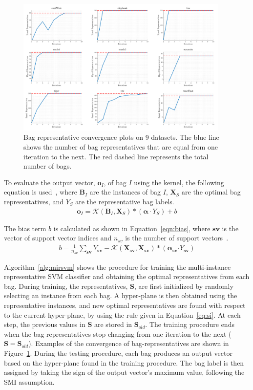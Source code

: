 \documentclass[preprint,12pt]{elsarticle}
\newcommand{\spa}[1]{\mathcal{#1}}
\begin{document}
\newpage
\begin{figure}
\centering
\label{fig:convegence}
\includegraphics[width=0.94\textwidth]{convergence.png} 
\caption{Bag representative convergence plots on 9 datasets. The blue line shows the number of bag representatives that are equal from one iteration to the next. The red dashed line represents the total number of bags.}
\end{figure}
To evaluate the output vector, $\bm o_I$, of bag $I$ using the kernel, the following equation is used~\citep{Huang2006}, where $\bm B_I$ are the instances of bag $I$, $\bm X_S$ are the optimal bag representatives, and $Y_S$ are the representative bag labels.
\begin{align}
\bm o_I = \spa{K}(\bm B_I,\bm X_S)*(\bm\alpha \cdot Y_S) + b
\end{align}

The bias term $b$ is calculated as shown in Equation~\eqref{eqn:bias}, where $\bm{sv}$ is the vector of support vector indices and $n_{sv}$ is the number of support vectors~\citep{Huang2006}.
\begin{align}
\label{eqn:bias}
b = \frac{1}{n_{sv}}\sum_{\bm{sv}} Y_{\bm{sv}} - \spa{K}(\bm X_{\bm{sv}},\bm X_{\bm{sv}})*(\bm \alpha_{\bm{sv}}\bm\cdot Y_{\bm{sv}})
\end{align}

Algorithm~\ref{alg:mirsvm} shows the procedure for training the multi-instance representative SVM classifier and obtaining the optimal representatives from each bag.  During training, the representatives, $\bm S$, are first initialized by randomly selecting an instance from each bag. A hyper-plane is then obtained using the representative instances, and new optimal representatives are found with respect to the current hyper-plane, by using the rule given in Equation~\eqref{eq:si}. At each step, the previous values in $\bm S$ are stored in $\bm S_{old}$. The training procedure ends when the bag representatives stop changing from one iteration to the next ($\bm S = \bm S_{old}$). Examples of the convergence of bag-representatives are shown in Figure~\ref{fig:convegence}. During the testing procedure, each bag produces an output vector based on the hyper-plane found in the training procedure. The bag label is then assigned by taking the sign of the output vector's maximum value, following the SMI assumption. 
\end{document}

